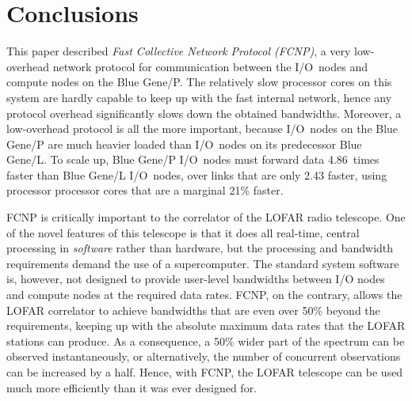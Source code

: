 \documentclass[conference]{worldcomp}
\begin{document}
\section{Conclusions}
\label{sec:conclusions}

This paper described \emph{Fast Collective Network Protocol (FCNP)}, a very
low-overhead network protocol for communication between the I/O~nodes and
compute nodes on the Blue Gene/P.
The relatively slow processor cores on this system are hardly capable to
keep up with the fast internal network, hence any protocol overhead
significantly slows down the obtained bandwidths.
Moreover, a low-overhead protocol is all the more important, because I/O~nodes
on the Blue Gene/P are much heavier loaded than I/O~nodes on its predecessor
Blue Gene/L.
To scale up, Blue Gene/P I/O~nodes must forward data 4.86~times faster than
Blue Gene/L I/O~nodes, over links that are only 2.43 faster, using processor
processor cores that are a marginal 21\% faster.

FCNP is critically important to the correlator of the LOFAR radio telescope.
One of the novel features of this telescope is that it does all real-time,
central processing in \emph{software\/} rather than hardware, but the
processing and bandwidth requirements demand the use of a supercomputer.
The standard system software is, however, not designed to provide user-level
bandwidths between I/O nodes and compute nodes at the required data rates.
FCNP, on the contrary, allows the LOFAR correlator to achieve bandwidths
that are even over 50\% beyond the requirements, keeping up with the
absolute maximum data rates that the LOFAR stations can produce.
As a consequence, a 50\% wider part of the spectrum can be observed
instantaneously, or alternatively, the number of concurrent observations
can be increased by a half.
Hence, with FCNP, the LOFAR telescope can be used much more efficiently than
it was ever designed for.





\end{document}
